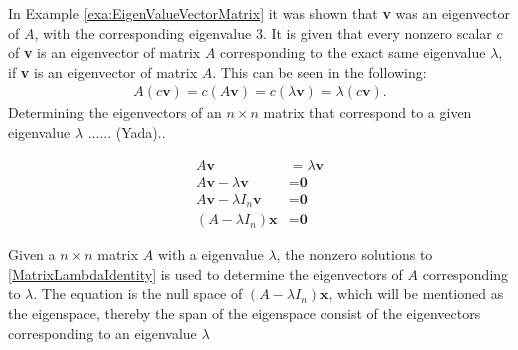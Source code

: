 In Example \ref{exa:EigenValueVectorMatrix} it was shown that \textbf{v} was an eigenvector of $A$, with the corresponding eigenvalue 3. It is given that every nonzero scalar $c$ of \textbf{v} is an eigenvector of matrix $A$ corresponding to the exact same eigenvalue $\lambda$, if \textbf{v} is an eigenvector of matrix $A$. This can be seen in the following:
\begin{align*}
    A(c\textbf{v})=c(A\textbf{v})=c(\lambda\textbf{v})=\lambda(c\textbf{v}).
\end{align*}
Determining the eigenvectors of an $n\times n$ matrix that correspond to a given eigenvalue $\lambda$  ...... (Yada)..

\begin{align}
\nonumber A\textbf{v}&=\lambda\textbf{v}\\ 
\nonumber A\textbf{v}-\lambda\textbf{v}&=\textbf{0}\\ 
\nonumber A\textbf{v}-\lambda I_n \textbf{v}&=\textbf{0}\\
(A-\lambda I_n)\textbf{x}&=\textbf{0}
\label{MatrixLambdaIdentity}
\end{align}

Given a $n\times n$ matrix $A$ with a eigenvalue $\lambda$, the nonzero solutions to \eqref{MatrixLambdaIdentity} is used to determine the eigenvectors of $A$ corresponding to $\lambda$.
The equation is the null space of $(A-\lambda I_n)\textbf{x}$, which will be mentioned as the eigenspace, thereby the span of the eigenspace consist of the eigenvectors corresponding to an eigenvalue $\lambda$


